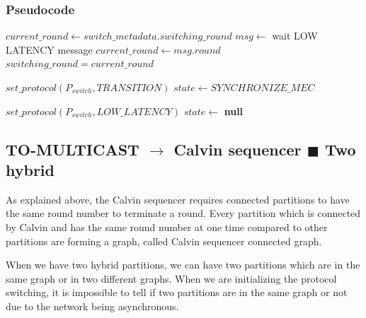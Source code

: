 \documentclass[a4paper, 10pt]{article}
\newcommand{\Li}[1]{\mynote{Li}{#1}{blue}}
\begin{document}
\subsubsection{Pseudocode}

\begin{algorithmic}[1]
     \label{alg:line:calvin_1:round}
            \State $current\_round \gets switch\_metadata.switching\_round$
            \State $msg \gets$ wait LOW LATENCY message
            \State $current\_round \gets msg.round$
        \EndIf
        \State $switching\_round = current\_round$

        \State $set\_protocol(P_{switch}, TRANSITION)$
        \State $state \gets SYNCHRONIZE\_MEC$
    \EndUpon \label{alg:line:calvin_1:round:end}

     \label{alg:line:calvin_1:switch}
        \State $set\_protocol(P_{switch}, LOW\_LATENCY)$
        \State $state \gets$ \textbf{null} \label{alg:line:calvin_1:switch:end}
    \EndUpon
\end{algorithmic}

\subsection{TO-MULTICAST $\rightarrow$ Calvin sequencer {\tiny$\blacksquare$} Two hybrid}

As explained above, the Calvin sequencer requires connected partitions to have the same round number to
terminate a round. Every partition which is connected by Calvin and has the same round number at one time
compared to other partitions are forming a graph, called Calvin sequencer connected graph.

When we have two hybrid partitions, we can have two partitions which are in the same graph or in two
different graphs. When we are initializing the protocol switching, it is impossible to tell if
two partitions are in the same graph or not due to the network being asynchronous.

\end{document}
